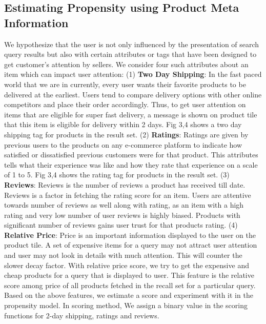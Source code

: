 \documentclass[11pt]{article}
\begin{document}
\subsection{Estimating Propensity using Product Meta Information}  
We hypothesize that the user is not only influenced by the presentation of search query results but also with certain attributes or tags that have been designed to get customer's attention by sellers.
\newline We consider four such attributes about an item which can impact user attention:
\newline(1) \textbf{Two Day Shipping}: In the fast paced world that we are in currently, every user wants their favorite products to be delivered at the earliest. Users tend to compare delivery options with other online competitors and place their order accordingly. Thus, to get user attention on items that are eligible for super fast delivery, a message is shown on product tile that this item is eligible for delivery within 2 days.  Fig 3,4 shows a two day shipping tag for products in the result set.
\newline(2) \textbf{Ratings}:  Ratings are given by previous users to the products on any e-commerce platform to indicate how satisfied or dissatisfied previous customers were for that product. This attributes tells what their experience was like and how they rate that experience on a scale of 1 to 5. Fig 3,4 shows the rating tag for products in the result set. 
\newline(3) \textbf{Reviews}: Reviews is the number of reviews a product has received till date. Reviews is a factor in fetching the rating score for an item. Users are attentive towards number of reviews as well along with rating, as an item with a high rating and very low number of user reviews is highly biased. Products with significant number of reviews gains user trust for that products rating.
\newline(4) \textbf{Relative Price}: Price is an important information displayed to the user on the product tile. A set of expensive items for a query may not attract user attention and user may not look in details with much attention. This will counter the slower decay factor. With relative price score, we try to get the expensive and cheap products for a query that is displayed to user. This feature is the relative score among price of all products fetched in the recall set for a particular query. \newline
~\\Based on the above features, we estimate a score and experiment with it in the propensity model. In scoring method, We assign a binary value in the scoring functions for 2-day shipping, ratings and reviews. 
\end{document}

